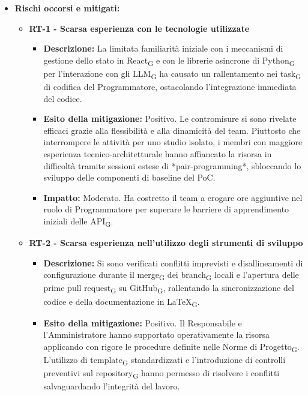 \documentclass[a4paper, 10pt, colorlinks=true, linkcolor=black, urlcolor=blue, citecolor=blue, hidelinks]{article}
\begin{document}
\begin{itemize}
    \item \textbf{Rischi occorsi e mitigati:}
    \begin{itemize}
        \item \textbf{RT-1 - Scarsa esperienza con le tecnologie utilizzate}
        \begin{itemize}
            \item \textbf{Descrizione:} La limitata familiarità iniziale con i meccanismi di gestione dello stato in React\textsubscript{G} e con le librerie asincrone di Python\textsubscript{G} per l'interazione con gli LLM\textsubscript{G} ha causato un rallentamento nei task\textsubscript{G} di codifica del Programmatore, ostacolando l'integrazione immediata del codice.
            \item \textbf{Esito della mitigazione:} Positivo. Le contromisure si sono rivelate efficaci grazie alla flessibilità e alla dinamicità del team. Piuttosto che interrompere le attività per uno studio isolato, i membri con maggiore esperienza tecnico-architetturale hanno affiancato la risorsa in difficoltà tramite sessioni estese di *pair-programming*, sbloccando lo sviluppo delle componenti di baseline del PoC.
            \item \textbf{Impatto:} Moderato. Ha costretto il team a erogare ore aggiuntive nel ruolo di Programmatore per superare le barriere di apprendimento iniziali delle API\textsubscript{G}.
        \end{itemize}
        \item \textbf{RT-2 - Scarsa esperienza nell'utilizzo degli strumenti di sviluppo}
        \begin{itemize}
            \item \textbf{Descrizione:} Si sono verificati conflitti imprevisti e disallineamenti di configurazione durante il merge\textsubscript{G} dei branch\textsubscript{G} locali e l'apertura delle prime pull request\textsubscript{G} su GitHub\textsubscript{G}, rallentando la sincronizzazione del codice e della documentazione in LaTeX\textsubscript{G}.
            \item \textbf{Esito della mitigazione:} Positivo. Il Responsabile e l'Amministratore hanno supportato operativamente la risorsa applicando con rigore le procedure definite nelle Norme di Progetto\textsubscript{G}. L'utilizzo di template\textsubscript{G} standardizzati e l'introduzione di controlli preventivi sul repository\textsubscript{G} hanno permesso di risolvere i conflitti salvaguardando l'integrità del lavoro.

\end{itemize}
\end{itemize}
\end{itemize}
\end{document}

